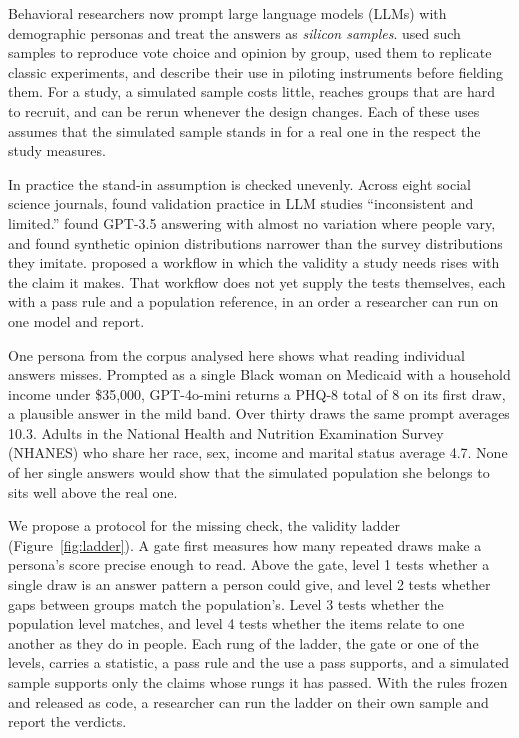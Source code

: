 
Behavioral researchers now prompt large language models (LLMs) with demographic personas and treat the answers as \emph{silicon samples}.
\citet{argyle2023outofone} used such samples to reproduce vote choice and opinion by group, \citet{park2024diminished} used them to replicate classic experiments, and \citet{lin2026simulators} describe their use in piloting instruments before fielding them.
For a study, a simulated sample costs little, reaches groups that are hard to recruit, and can be rerun whenever the design changes.
Each of these uses assumes that the simulated sample stands in for a real one in the respect the study measures.

In practice the stand-in assumption is checked unevenly.
Across eight social science journals, \citet{desai2026validating} found validation practice in LLM studies ``inconsistent and limited.''
\citet{park2024diminished} found GPT-3.5 answering with almost no variation where people vary, and \citet{bisbee2024synthetic} found synthetic opinion distributions narrower than the survey distributions they imitate.
\citet{lin2026workflow} proposed a workflow in which the validity a study needs rises with the claim it makes.
That workflow does not yet supply the tests themselves, each with a pass rule and a population reference, in an order a researcher can run on one model and report.

One persona from the corpus analysed here shows what reading individual answers misses.
Prompted as a single Black woman on Medicaid with a household income under \$35,000, GPT-4o-mini returns a PHQ-8 total of 8 on its first draw, a plausible answer in the mild band. %
Over thirty draws the same prompt averages 10.3. %
Adults in the National Health and Nutrition Examination Survey (NHANES) who share her race, sex, income and marital status average 4.7. %
None of her single answers would show that the simulated population she belongs to sits well above the real one.

We propose a protocol for the missing check, the validity ladder (Figure~\ref{fig:ladder}).
A gate first measures how many repeated draws make a persona's score precise enough to read.
Above the gate, level 1 tests whether a single draw is an answer pattern a person could give, and level 2 tests whether gaps between groups match the population's.
Level 3 tests whether the population level matches, and level 4 tests whether the items relate to one another as they do in people.
Each rung of the ladder, the gate or one of the levels, carries a statistic, a pass rule and the use a pass supports, and a simulated sample supports only the claims whose rungs it has passed.
With the rules frozen and released as code, a researcher can run the ladder on their own sample and report the verdicts.

